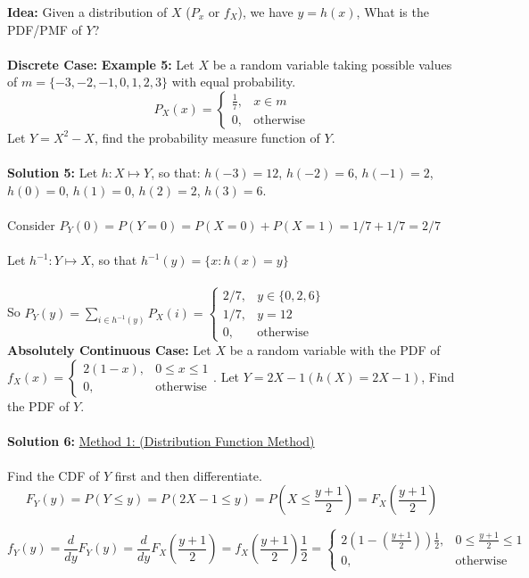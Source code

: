 \documentclass[12pt]{article}
\begin{document}
\textbf{Idea:} Given a distribution of $X$ ($P_x$ or $f_X$), we have $y = h(x)$, What is the PDF/PMF of $Y$?\\
\\
\textbf{Discrete Case:} \textbf{Example 5:} Let $X$ be a random variable taking possible values of $m = \{ -3, -2, -1, 0, 1, 2, 3 \}$ with equal probability.
$$P_X (x) = \begin{cases}
	\frac{1}{7}, & x\in m\\
	0, & \text{otherwise}
\end{cases}
$$
Let $Y = X^2 - X$, find the probability measure function of $Y$.\\
\\
\textbf{Solution 5:} Let $h : X \mapsto Y$, so that: $h(-3) = 12$, $h(-2) = 6$, $h(-1) = 2$, $h(0) = 0$, $h(1) = 0$, $h(2) = 2$, $h(3) = 6$.\\
\\
Consider $P_Y (0) = P(Y = 0) = P(X = 0) + P(X = 1) = 1/7 + 1/7 = 2/7$\\
\\
Let $h^{-1} : Y \mapsto X$, so that $h^{-1} (y) = \{ x : h(x) = y \}$\\
\\
So $P_Y (y) = \sum_{i \in h^{-1} (y)} P_X (i) = \begin{cases}
	2/7, & y \in \{ 0,2,6 \}\\
	1/7, & y = 12\\
	0, & \text{otherwise}
\end{cases}
$
\\
\textbf{Absolutely Continuous Case:}  Let $X$ be a random variable with the PDF of $f_X (x) = \begin{cases}
	2(1-x), & 0 \leq x \leq 1\\
	0, & \text{otherwise}
\end{cases}
$. Let $Y = 2X - 1 (h(X) = 2X - 1)$, Find the PDF of $Y$.\\
\\
\textbf{Solution 6:} \underline{Method 1: (Distribution Function Method)}\\
\\
Find the CDF of $Y$ first and then differentiate.
$$F_Y (y) = P(Y \leq y) = P(2X - 1 \leq y) = P(X \leq \frac{y+1}{2}) = F_X (\frac{y+1}{2})$$

$$f_Y (y) = \frac{d}{dy} F_Y (y) = \frac{d}{dy} F_X (\frac{y+1}{2}) = f_X (\frac{y+1}{2}) \frac{1}{2} = \begin{cases}
	2(1 - (\frac{y+1}{2}))\frac{1}{2}, & 0 \leq \frac{y+1}{2} \leq 1\\
	0, & \text{otherwise}
\end{cases}
$$
\end{document}
